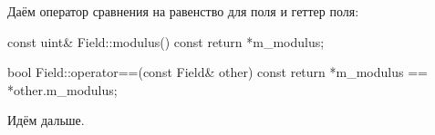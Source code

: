   Даём оператор сравнения на равенство для поля и геттер поля:
  \begin{cppcode}
const uint& Field::modulus() const {
    return *m_modulus;
}

bool Field::operator==(const Field& other) const {
    return *m_modulus == *other.m_modulus;
}
  \end{cppcode}

  Идём дальше.

